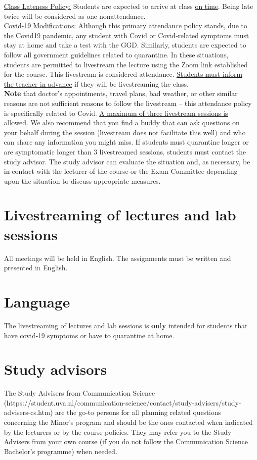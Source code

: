 \documentclass[a4paper,10pt,twocolumn]{report}
\begin{document}
	\underline{Class Lateness Policy:} Students are expected to arrive at class \underline{on time}. Being late twice will be considered as one nonattendance. \\

	\underline{Covid-19 Modifications:} Although this primary attendance policy stands, due to the Covid19 pandemic, any student with Covid or Covid-related symptoms must stay at home and take a test with the GGD.  Similarly, students are expected to follow all government guidelines related to quarantine. In these situations, students are permitted to livestream the lecture using the Zoom link established for the course. This livestream is considered attendance. \underline{Students must inform the teacher in advance} if they will be livestreaming the class. \\  

	\textbf{Note} that doctor's appointments, travel plans, bad weather, or other similar reasons are not sufficient reasons to follow the livestream – this attendance policy is specifically related to Covid. \underline{A maximum of three livestream sessions is allowed.} We also recommend that you find a buddy that can ask questions on your behalf during the session (livestream does not facilitate this well) and who can share any information you might miss.  If students must quarantine longer or are symptomatic longer than 3 livestreamed sessions, students must contact the study advisor. The study advisor can evaluate the situation and, as necessary, be in contact with the lecturer of the course or the Exam Committee depending upon the situation to discuss appropriate measures. 

	\section{Livestreaming of lectures and lab sessions}
	All meetings will be held in English. The assignments must be written and presented in English. 


	\section{Language}
	The livestreaming of lectures and lab sessions is \textbf{only} intended for students that have covid-19 symptoms or have to quarantine at home. 

	\section{Study advisors}
	The Study Advisers from Communication Science (https://student.uva.nl/communication-science/contact/study-advisers/study-advisers-cs.htm) are the go-to persons for all planning related questions concerning the Minor’s program and should be the ones contacted when indicated by the lecturers or by the course policies. They may refer you to the Study Advisers from your own course (if you do not follow the Communication Science Bachelor’s programme) when needed. 
	
\end{document}
